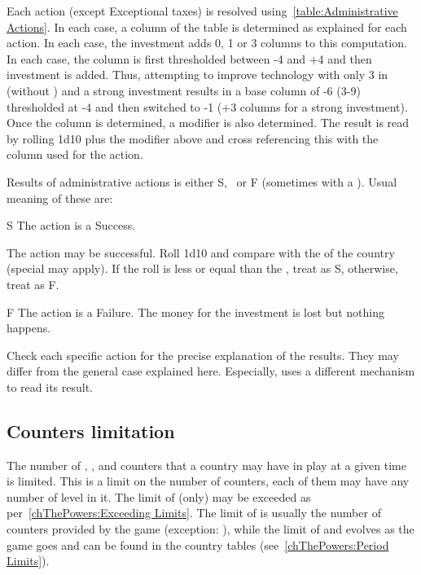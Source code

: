 \aparag Each action (except Exceptional taxes) is resolved
using~\ref{table:Administrative Actions}.
\bparag In each case, a column of the table is determined as explained for
each action.
\bparag In each case, the investment adds 0, 1 or 3 columns to this
computation. In each case, the column is first thresholded between -4 and +4
and then investment is added. Thus, attempting to improve technology with only
3 in \MIL (without \MNU) and a strong investment results in a base column of
-6 (3-9) thresholded at -4 and then switched to -1 (+3 columns for a strong
investment).
\bparag Once the column is determined, a modifier is also determined.
\bparag The result is read by rolling 1d10 plus the modifier above and cross
referencing this with the column used for the action.

\aparag Results of administrative actions is either S, \undemi\ or F
(sometimes with a \textetoile).
\bparag Usual meaning of these are:
\begin{modlist}
\item[S] The action is a Success.
\item[\undemi] The action may be successful. Roll 1d10 and compare with the
  \FTI of the country (special \FTI may apply). If the roll is less or equal
  than the \FTI, treat as S, otherwise, treat as F.
\item[F] The action is a Failure. The money for the investment is lost but
  nothing happens.
\end{modlist}
\bparag Check each specific action for the precise explanation of the
results. They may differ from the general case explained here. Especially,
 uses a different mechanism to read its result.





\subsection{Counters limitation}

\aparag The number of \COL, \TP, \MNU and \TradeFLEET counters that a country
may have in play at a given time is limited.
\bparag This is a limit on the number of counters, each of them may have any
number of level in it.
\bparag The limit of \MNU (only) may be exceeded as
per~\ref{chThePowers:Exceeding Limits}.
\bparag The limit of \TradeFLEET is usually the number of counters provided by
the game (exception: \SUE), while the limit of \COL and \TP evolves as the
game goes and can be found in the country tables (see~\ref{chThePowers:Period
  Limits}).

